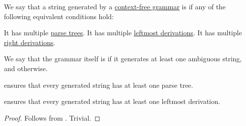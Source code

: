 \begin{definition}\label{def:grammar_ambiguity}
  We say that a string generated by a \hyperref[def:chomsky_hierarchy/context_free]{context-free grammar} is  if any of the following equivalent conditions hold:
  \begin{thmenum}
     It has multiple \hyperref[def:parse_tree]{parse trees}.
     It has multiple \hyperref[def:leftmost_derivation]{leftmost derivations}.
     It has multiple \hyperref[def:leftmost_derivation]{right derivations}.
  \end{thmenum}

  We say that the grammar itself is  if it generates at least one ambiguous string, and  otherwise.
\end{definition}
\begin{comments}
  \item {} ensures that every generated string has at least one parse tree.
  \item {} ensures that every generated string has at least one leftmost derivation.
\end{comments}
\begin{proof}
   Follows from .
   Trivial.
\end{proof}

